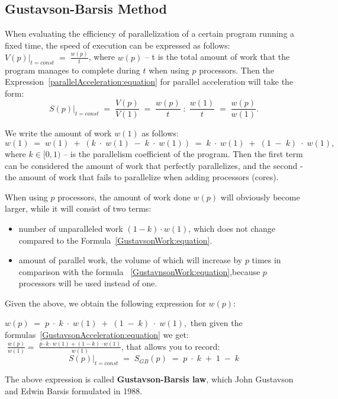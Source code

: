 { %
	\subsection{Gustavson-Barsis Method}
	\par When evaluating the efficiency of parallelization of a certain program running a fixed time, the speed of execution can be expressed as follows: $\left.V(p)\right|_{t=const}\;=\;\frac {w(p)}t$, where $w(p)$ – t is the total amount of work that the program manages to complete during $ t $ when using $p$ processors. Then the Expression~\eqref{parallelAcceleration:equation} for parallel acceleration will take the form:
	\begin{equation}
		\label{GustavsonAcceleration:equation}
		\left.S(p)\right|_{t=const}\;=\;\frac{V(p)}{V(1)}\;=\;\frac{w(p)}t\;:\;\frac{w(1)}t\;=\;\frac{w(p)}{w(1)}.
	\end{equation}
	\par We write the amount of work $w (1)$ as follows:
	\begin{equation}
		\label{GustavsonWork:equation}
		w(1)\;=\;w(1)\;+\;(k\;\cdot\;w(1)\;-\;k\;\cdot\;w(1))\;=\;k\;\cdot\;w(1)\;+\;(1\;-\;k)\;\cdot\;w(1),
	\end{equation}
	where $k\in\lbrack0,1)$ – is the parallelism coefficient of the program. Then the first term can be considered the amount of work that perfectly parallelizes, and the second - the amount of work that fails to parallelize when adding processors (cores).
	\par When using $p$ processors, the amount of work done $w(p)$ will obviously become larger, while it will consist of two terms:
	\begin{itemize}
		\item number of unparalleled work $(1-k)\cdot w(1)$, which does not change compared to the Formula~\eqref{GustavsonWork:equation}.
		\item amount of parallel work, the volume of which will increase by $p$ times in comparison with the formula ~\eqref{GustavnsonWork:equation},because $p$ processors will be used instead of one.
	\end{itemize}
	\par Given the above, we obtain the following expression for $w(p)$:
	\par$w(p)\;=\;p\;\cdot\;k\;\cdot\;w(1)\;+\;(1\;-\;k)\;\cdot\;w(1),$ then given the formulas~\eqref{GustavsonAcceleration:equation} we get: $\;\frac{w(p)}{w(1)}=\;\frac{p\cdot k\cdot w(1)+(1-k)\cdot w(1)}{w(1)}$, that allows you to record:
	\begin{equation}
		\left.S(p)\right|_{t=const}\;=\;S_{GB}(p)\;=\;p\;\cdot\;k\;+\;1\;-\;k
	\end{equation}
	\par The above expression is called \textbf {Gustavson-Barsis law}, which John Gustavson and Edwin Barsis formulated in 1988.
	\par
}